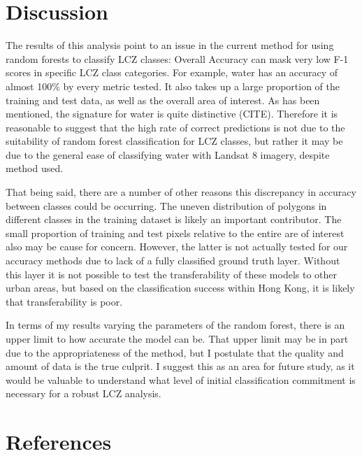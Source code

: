 \documentclass[
]{article}
\begin{document}
\hypertarget{discussion}{%
\section{Discussion}\label{discussion}}

The results of this analysis point to an issue in the current method for
using random forests to classify LCZ classes: Overall Accuracy can mask
very low F-1 scores in specific LCZ class categories. For example, water
has an accuracy of almost 100\% by every metric tested. It also takes up
a large proportion of the training and test data, as well as the overall
area of interest. As has been mentioned, the signature for water is
quite distinctive (CITE). Therefore it is reasonable to suggest that the
high rate of correct predictions is not due to the suitability of random
forest classification for LCZ classes, but rather it may be due to the
general ease of classifying water with Landsat 8 imagery, despite method
used.

That being said, there are a number of other reasons this discrepancy in
accuracy between classes could be occurring. The uneven distribution of
polygons in different classes in the training dataset is likely an
important contributor. The small proportion of training and test pixels
relative to the entire are of interest also may be cause for concern.
However, the latter is not actually tested for our accuracy methods due
to lack of a fully classified ground truth layer. Without this layer it
is not possible to test the transferability of these models to other
urban areas, but based on the classification success within Hong Kong,
it is likely that transferability is poor.

In terms of my results varying the parameters of the random forest,
there is an upper limit to how accurate the model can be. That upper
limit may be in part due to the appropriateness of the method, but I
postulate that the quality and amount of data is the true culprit. I
suggest this as an area for future study, as it would be valuable to
understand what level of initial classification commitment is necessary
for a robust LCZ analysis.

\newpage

\hypertarget{references}{%
\section{References}\label{references}}
\end{document}
